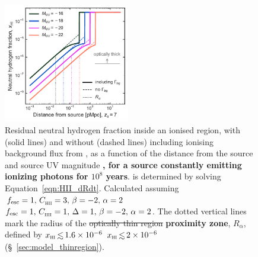 \documentclass[fleqn,usenatbib]{mnras}
\providecommand{\DIFadd}[1]{{\protect\color{Green} \bf #1}} %
\providecommand{\DIFdel}[1]{{\protect\color{lightgray} \footnotesize \sout{#1}}} %
\providecommand{\DIFaddFL}[1]{\DIFadd{#1}} %
\providecommand{\DIFdelFL}[1]{\DIFdel{#1}} %
\providecommand{\DIFaddbeginFL}{} %
\providecommand{\DIFaddendFL}{} %
\providecommand{\DIFdelbeginFL}{} %
\providecommand{\DIFdelendFL}{} %
\newcommand{\DIFscaledelfig}{0.5}
\newlength{\DIFdelgraphicswidth} %
\newlength{\DIFdelgraphicsheight} %
\newcommand{\DIFaddincludegraphics}[2][]{{\color{blue}\fbox{\DIFOincludegraphics[#1]{#2}}}} %
\newcommand{\DIFdelincludegraphics}[2][]{%
\sbox{\DIFdelgraphicsbox}{\DIFOincludegraphics[#1]{#2}}%
\settoboxwidth{\DIFdelgraphicswidth}{\DIFdelgraphicsbox} %
\settoboxtotalheight{\DIFdelgraphicsheight}{\DIFdelgraphicsbox} %
\scalebox{\DIFscaledelfig}{%
\parbox[b]{\DIFdelgraphicswidth}{\usebox{\DIFdelgraphicsbox}\\[-\baselineskip] \rule{\DIFdelgraphicswidth}{0em}}\llap{\resizebox{\DIFdelgraphicswidth}{\DIFdelgraphicsheight}{%
\setlength{\unitlength}{\DIFdelgraphicswidth}%
\begin{picture}(1,1)%
\thicklines\linethickness{2pt} %
{\color[rgb]{1,0,0}\put(0,0){\framebox(1,1){}}}%
{\color[rgb]{1,0,0}\put(0,0){\line( 1,1){1}}}%
{\color[rgb]{1,0,0}\put(0,1){\line(1,-1){1}}}%
\end{picture}%
}\hspace*{3pt}}} %
} %
\DeclareRobustCommand{\DIFaddbeginFL}{\DIFOaddbeginFL \let\includegraphics\DIFaddincludegraphics} %
\DeclareRobustCommand{\DIFaddendFL}{\DIFOaddendFL \let\includegraphics\DIFOincludegraphics} %
\DeclareRobustCommand{\DIFdelbeginFL}{\DIFOdelbeginFL \let\includegraphics\DIFdelincludegraphics} %
\DeclareRobustCommand{\DIFdelendFL}{\DIFOaddendFL \let\includegraphics\DIFOincludegraphics} %
\begin{document}
\begin{figure}
    \includegraphics[width=0.49\textwidth]{figs/fig2.pdf}
    \caption{Residual neutral hydrogen fraction inside an ionised region, with (solid lines) and without (dashed lines) including ionising background flux from \citet{Khaire2019}, as a function of the distance from the source and source UV magnitude\DIFaddbeginFL \DIFaddFL{, for a source constantly emitting ionizing photons for $10^8$ years}\DIFaddendFL . \Rion is determined by solving Equation~\eqref{eqn:HII_dRdt}. Calculated assuming \DIFdelbeginFL \DIFdelFL{$\fesc=1, \, \clump=3, \, \beta=-2, \, \alpha = 2$}\DIFdelendFL \DIFaddbeginFL \DIFaddFL{$\fesc=1, \, \clump=1, \, \Delta=1, \, \beta=-2, \, \alpha = 2$}\DIFaddendFL . The dotted vertical lines mark the radius of the \DIFdelbeginFL \DIFdelFL{optically thin region}\DIFdelendFL \DIFaddbeginFL \DIFaddFL{proximity zone}\DIFaddendFL , $R_\alpha$, defined by \DIFdelbeginFL \DIFdelFL{$\xHI \simlt 1.6\times10^{-6}$ }\DIFdelendFL \DIFaddbeginFL \DIFaddFL{$\xHI \simlt 2\times10^{-6}$ }\DIFaddendFL (\S~\ref{sec:model_thinregion}).}
    \label{fig:x_HII_r}
\end{figure}
\end{document}
